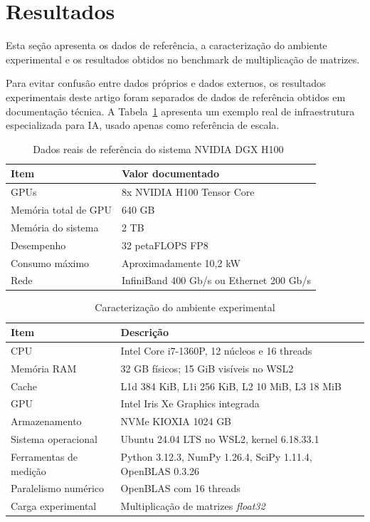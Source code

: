 \section{Resultados}
\label{sec:resultados}

Esta seção apresenta os dados de referência, a caracterização do ambiente experimental e os resultados obtidos no benchmark de multiplicação de matrizes.

Para evitar confusão entre dados próprios e dados externos, os resultados experimentais deste artigo foram separados de dados de referência obtidos em documentação técnica. A Tabela~\ref{tab:referencia-dgx} apresenta um exemplo real de infraestrutura especializada para IA, usado apenas como referência de escala.

\begin{table}[ht]
\centering
\caption{Dados reais de referência do sistema NVIDIA DGX H100~\cite{nvidiaDgxH100}}
\label{tab:referencia-dgx}
\begin{tabular}{ll}
\toprule
\textbf{Item} & \textbf{Valor documentado} \\
\midrule
GPUs & 8x NVIDIA H100 Tensor Core \\
Memória total de GPU & 640 GB \\
Memória do sistema & 2 TB \\
Desempenho & 32 petaFLOPS FP8 \\
Consumo máximo & Aproximadamente 10,2 kW \\
Rede & InfiniBand 400 Gb/s ou Ethernet 200 Gb/s \\
\bottomrule
\end{tabular}
\end{table}

\begin{table}[ht]
\centering
\caption{Caracterização do ambiente experimental}
\label{tab:ambiente}
\begin{tabular}{ll}
\toprule
\textbf{Item} & \textbf{Descrição} \\
\midrule
CPU & Intel Core i7-1360P, 12 núcleos e 16 threads \\
Memória RAM & 32 GB físicos; 15 GiB visíveis no WSL2 \\
Cache & L1d 384 KiB, L1i 256 KiB, L2 10 MiB, L3 18 MiB \\
GPU & Intel Iris Xe Graphics integrada \\
Armazenamento & NVMe KIOXIA 1024 GB \\
Sistema operacional & Ubuntu 24.04 LTS no WSL2, kernel 6.18.33.1 \\
Ferramentas de medição & Python 3.12.3, NumPy 1.26.4, SciPy 1.11.4, OpenBLAS 0.3.26 \\
Paralelismo numérico & OpenBLAS com 16 threads \\
Carga experimental & Multiplicação de matrizes \textit{float32} \\
\bottomrule
\end{tabular}
\end{table}

